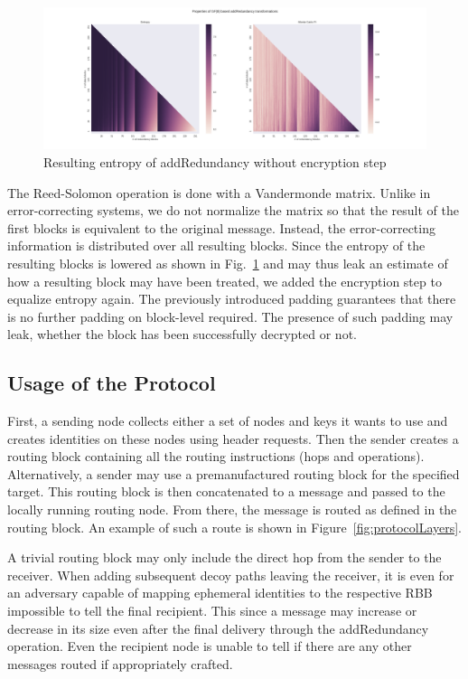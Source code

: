 \documentclass[acmsmall, screen]{acmart}
\begin{document}
\begin{figure}[ht]\centering
	\includegraphics[width=1\columnwidth]{../../inc/randomblock_10kb}
	\caption{Resulting entropy of addRedundancy without encryption step}
	\label{fig:entropy}
\end{figure}


The Reed-Solomon operation is done with a Vandermonde matrix. Unlike in error-correcting systems, we do not normalize the matrix so that the result of the first blocks is equivalent to the original message. Instead, the error-correcting information is distributed over all resulting blocks. Since the entropy of the resulting blocks is lowered as shown in Fig.~\ref{fig:entropy} and may thus leak an estimate of how a resulting block may have been treated, we added the encryption step to equalize entropy again. The previously introduced padding guarantees that there is no further padding on block-level required. The presence of such padding may leak, whether the block has been successfully decrypted or not.

\subsection{Usage of the Protocol}
First, a sending node collects either a set of nodes and keys it wants to use and creates identities on these nodes using header requests. Then the sender creates a routing block containing all the routing instructions (hops and operations). Alternatively, a sender may use a premanufactured routing block for the specified target. This routing block is then concatenated to a message and passed to the locally running routing node. From there, the message is routed as defined in the routing block. An example of such a route is shown in Figure~\ref{fig:protocolLayers}.

A trivial routing block may only include the direct hop from the sender to the receiver. When adding subsequent decoy paths leaving the receiver, it is even for an adversary capable of mapping ephemeral identities to the respective RBB impossible to tell the final recipient. This since a message may increase or decrease in its size even after the final delivery through the addRedundancy operation. Even the recipient node is unable to tell if there are any other messages routed if appropriately crafted.
\end{document}
